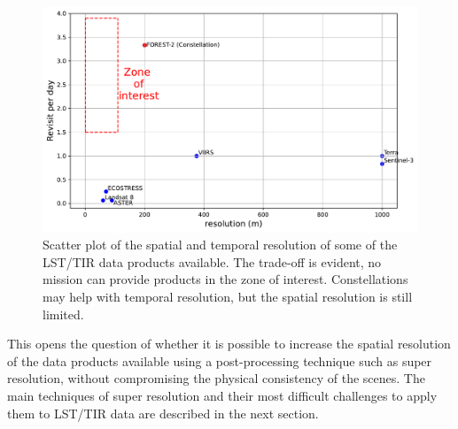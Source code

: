         \begin{figure}[H]
            \centering
            \includegraphics[width=\textwidth]{Includes/2-scatterplot-res-revisit.pdf}
            \caption{Scatter plot of the spatial and temporal resolution of some of the LST/TIR data products available.
                     The trade-off is evident, no mission can provide products in the zone of interest.
                     Constellations may help with temporal resolution, but the spatial resolution is still limited.}
            \label{fig:1-spatio-temporal-trade-off}
        \end{figure}

        This opens the question of whether it is possible to increase the spatial resolution of the data products available using a post-processing technique such as super resolution, without compromising the physical consistency of the scenes.
        The main techniques of super resolution and their most difficult challenges to apply them to LST/TIR data are described in the next section.

\newpage
